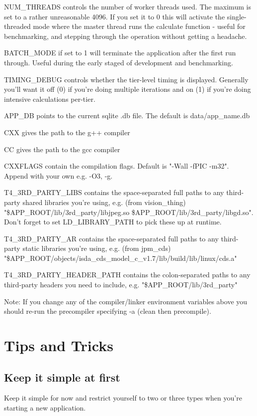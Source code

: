 \documentclass{report}
\begin{document}
NUM_THREADS controls the number of worker threads used. The maximum is set to a rather unreasonable 4096. If you set it to 0 this will activate the single-threaded mode where the master thread runs the calculate function - useful for benchmarking, and stepping through the operation without getting a headache.

BATCH_MODE if set to 1 will terminate the application after the first run through. Useful during the early staged of development and benchmarking.

TIMING_DEBUG controls whether the tier-level timing is displayed. Generally you'll want it off  (0) if you're doing multiple iterations and on (1) if you're doing intensive calculations per-tier.

APP_DB points to the current sqlite .db file. The default is data/app_name.db

CXX gives the path to the g++ compiler

CC gives the path to the gcc compiler

CXXFLAGS contain the compilation flags. Default is "-Wall -fPIC -m32". Append with your own e.g. -O3, -g.

T4_3RD_PARTY_LIBS contains the space-separated full paths to any third-party shared libraries you're using, e.g. (from vision_thing) "\$APP_ROOT/lib/3rd_party/libjpeg.so \$APP_ROOT/lib/3rd_party/libgd.so". Don't forget to set LD_LIBRARY_PATH to pick these up at runtime.

T4_3RD_PARTY_AR contains the space-separated full paths to any third-party static libraries you're using, e.g. (from jpm_cds) "\$APP_ROOT/objects/isda_cds_model_c_v1.7/lib/build/lib/linux/cds.a"

T4_3RD_PARTY_HEADER_PATH contains the colon-separated paths to any third-party headers you need to include, e.g. "\$APP_ROOT/lib/3rd_party"

Note: If you change any of the compiler/linker environment variables above you should re-run the precompiler specifying -a (clean then precompile).

\section{Tips and Tricks}

\subsection{Keep it simple at first}

Keep it simple for now and restrict yourself to two or three types when you're starting a new application.
\end{document}
